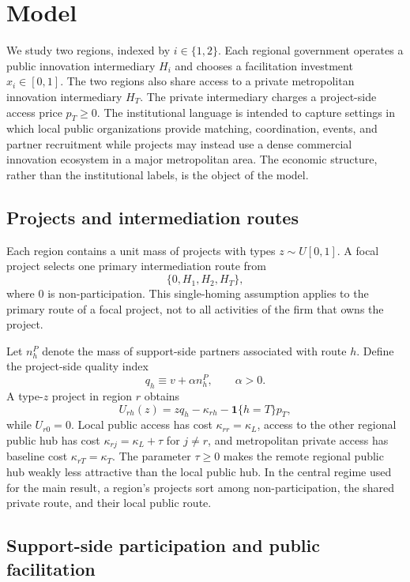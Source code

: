 \section{Model}\label{sec:model}

We study two regions, indexed by $i\in\{1,2\}$. Each regional government operates a public innovation intermediary $H_i$ and chooses a facilitation investment $x_i\in[0,1]$. The two regions also share access to a private metropolitan innovation intermediary $H_T$. The private intermediary charges a project-side access price $p_T\geq 0$. The institutional language is intended to capture settings in which local public organizations provide matching, coordination, events, and partner recruitment while projects may instead use a dense commercial innovation ecosystem in a major metropolitan area. The economic structure, rather than the institutional labels, is the object of the model.

\subsection{Projects and intermediation routes}

Each region contains a unit mass of projects with types $z\sim U[0,1]$. A focal project selects one primary intermediation route from
\[
\{0,H_1,H_2,H_T\},
\]
where $0$ is non-participation. This single-homing assumption applies to the primary route of a focal project, not to all activities of the firm that owns the project.

Let $n_h^P$ denote the mass of support-side partners associated with route $h$. Define the project-side quality index
\[
q_h \equiv v+\alpha n_h^P,\qquad \alpha>0.
\]
A type-$z$ project in region $r$ obtains
\begin{equation}
U_{rh}(z)
=
zq_h-\kappa_{rh}-\mathbf 1\{h=T\}p_T,
\label{eq:projectutility}
\end{equation}
while $U_{r0}=0$. Local public access has cost $\kappa_{rr}=\kappa_L$, access to the other regional public hub has cost $\kappa_{rj}=\kappa_L+\tau$ for $j\neq r$, and metropolitan private access has baseline cost $\kappa_{rT}=\kappa_T$. The parameter $\tau\geq0$ makes the remote regional public hub weakly less attractive than the local public hub. In the central regime used for the main result, a region's projects sort among non-participation, the shared private route, and their local public route.

\subsection{Support-side participation and public facilitation}

